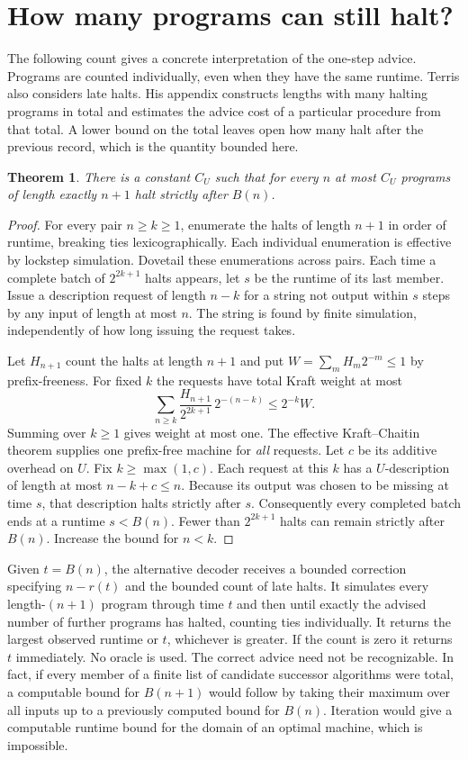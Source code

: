\documentclass[11pt]{article}
\newtheorem{theorem}{Theorem}
\newcommand{\BB}{B}
\begin{document}
\section*{How many programs can still halt?}
The following count gives a concrete interpretation of the one-step advice. Programs are counted individually, even when they have the same runtime. Terris \cite[Discussion and Appendix B]{terris} also considers late halts. His appendix constructs lengths with many halting programs in total and estimates the advice cost of a particular procedure from that total. A lower bound on the total leaves open how many halt after the previous record, which is the quantity bounded here.

\begin{theorem}\label{late}
There is a constant $C_U$ such that for every $n$ at most $C_U$ programs of length exactly $n+1$ halt strictly after $\BB(n)$.
\end{theorem}
\begin{proof}
For every pair $n\ge k\ge1$, enumerate the halts of length $n+1$ in order of runtime, breaking ties lexicographically. Each individual enumeration is effective by lockstep simulation. Dovetail these enumerations across pairs. Each time a complete batch of $2^{2k+1}$ halts appears, let $s$ be the runtime of its last member. Issue a description request of length $n-k$ for a string not output within $s$ steps by any input of length at most $n$. The string is found by finite simulation, independently of how long issuing the request takes.

Let $H_{n+1}$ count the halts at length $n+1$ and put $W=\sum_m H_m 2^{-m}\le1$ by prefix-freeness. For fixed $k$ the requests have total Kraft weight at most
\[
 \sum_{n\ge k} \frac{H_{n+1}}{2^{2k+1}}\,2^{-(n-k)}
 \le 2^{-k}W.
\]
Summing over $k\ge1$ gives weight at most one. The effective Kraft--Chaitin theorem supplies one prefix-free machine for \emph{all} requests. Let $c$ be its additive overhead on $U$. Fix $k\ge\max(1,c)$. Each request at this $k$ has a $U$-description of length at most $n-k+c\le n$. Because its output was chosen to be missing at time $s$, that description halts strictly after $s$. Consequently every completed batch ends at a runtime $s<\BB(n)$. Fewer than $2^{2k+1}$ halts can remain strictly after $\BB(n)$. Increase the bound for $n<k$.
\end{proof}

Given $t=\BB(n)$, the alternative decoder receives a bounded correction specifying $n-r(t)$ and the bounded count of late halts. It simulates every length-$(n+1)$ program through time $t$ and then until exactly the advised number of further programs has halted, counting ties individually. It returns the largest observed runtime or $t$, whichever is greater. If the count is zero it returns $t$ immediately. No oracle is used. The correct advice need not be recognizable. In fact, if every member of a finite list of candidate successor algorithms were total, a computable bound for $\BB(n+1)$ would follow by taking their maximum over all inputs up to a previously computed bound for $\BB(n)$. Iteration would give a computable runtime bound for the domain of an optimal machine, which is impossible.
\end{document}
